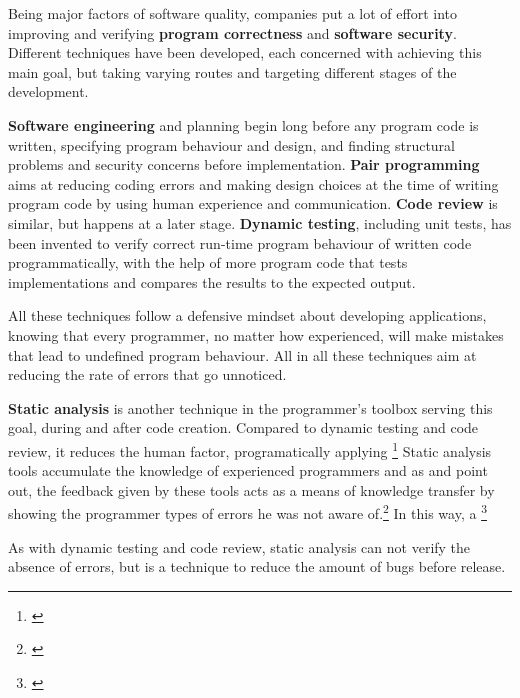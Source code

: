 Being major factors of software quality, companies put a lot of effort into improving and verifying \textbf{program correctness} and \textbf{software security}. Different techniques have been developed, each concerned with achieving this main goal, but taking varying routes and targeting different stages of the development.

\textbf{Software engineering} and planning begin long before any program code is written, specifying program behaviour and design, and finding structural problems and security concerns before implementation. \textbf{Pair programming} aims at reducing coding errors and making design choices at the time of writing program code by using human \linebreak experience and communication. \textbf{Code review} is similar, but happens at a later stage. \textbf{Dynamic testing}, including unit tests, has been invented to verify correct run-time program behaviour of written code programmatically, with the help of more program code that tests implementations and compares the results to the expected output.

All these techniques follow a defensive mindset about developing applications, knowing that every programmer, no matter how experienced, will make mistakes that lead to undefined program behaviour. All in all these techniques aim at reducing the rate of errors that go unnoticed.

\textbf{Static analysis} is another technique in the programmer's toolbox serving this goal, during and after code creation. Compared to dynamic testing and code review, it reduces the human factor, programatically applying \footnote{\citep[22]{SecureProgramming}} Static analysis tools accumulate the knowledge of experienced programmers and as  and  point out, the feedback given by these tools acts as a means of knowledge transfer by showing the programmer types of errors he was not aware of.\footnote{\citep[22]{SecureProgramming}} In this way, a \footnote{\citep[13]{SecureProgramming}}

As with dynamic testing and code review, static analysis can not verify the absence of errors, but is a technique to reduce the amount of bugs before release.


